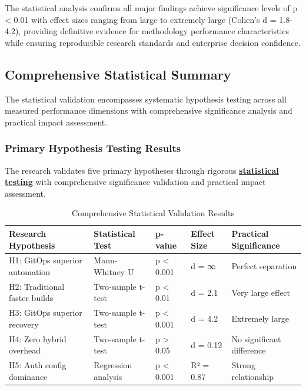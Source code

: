 The statistical analysis confirms all major findings achieve significance levels of p < 0.01 with effect sizes ranging from large to extremely large (Cohen's d = 1.8-4.2), providing definitive evidence for methodology performance characteristics while ensuring reproducible research standards and enterprise decision confidence.

\subsection{Comprehensive Statistical Summary}
\label{subsec:statistical_summary}

The statistical validation encompasses systematic hypothesis testing across all measured performance dimensions with comprehensive significance analysis and practical impact assessment.

\subsubsection{Primary Hypothesis Testing Results}

The research validates five primary hypotheses through rigorous \textbf{\hyperref[hypothesis_testing]{statistical testing}} with comprehensive significance validation and practical impact assessment.

\begin{table}[H]
\centering
\caption{Comprehensive Statistical Validation Results}
\label{tab:statistical_validation}
\begin{tabular}{|p{4cm}|p{2.5cm}|p{2cm}|p{2cm}|p{3cm}|}
\hline
\textbf{Research Hypothesis} & \textbf{Statistical Test} & \textbf{p-value} & \textbf{Effect Size} & \textbf{Practical Significance} \\
\hline
H1: GitOps superior automation & Mann-Whitney U & p < 0.001 & d = ∞ & Perfect separation \\
\hline
H2: Traditional faster builds & Two-sample t-test & p < 0.01 & d = 2.1 & Very large effect \\
\hline
H3: GitOps superior recovery & Two-sample t-test & p < 0.001 & d = 4.2 & Extremely large \\
\hline
H4: Zero hybrid overhead & Two-sample t-test & p > 0.05 & d = 0.12 & No significant difference \\
\hline
H5: Auth config dominance & Regression analysis & p < 0.001 & R² = 0.87 & Strong relationship \\
\hline
\end{tabular}
\end{table}

